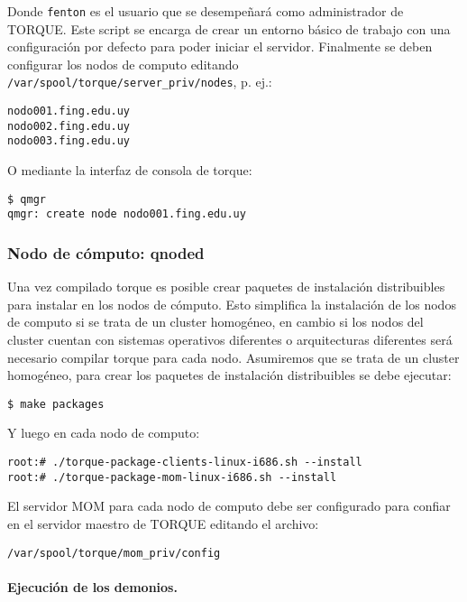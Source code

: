 \documentclass[a4paper,10pt,spanish]{article}
\begin{document}
Donde \mbox{\texttt{fenton}} es el usuario que se desempe\~{n}ar\'{a} como administrador de TORQUE. Este script se encarga de crear un entorno b\'{a}sico de trabajo con una configuraci\'{o}n por defecto para poder iniciar el servidor. Finalmente se deben configurar los nodos de computo editando \mbox{\texttt{/var/spool/torque/server\_priv/nodes}}, p. ej.:

\begin{verbatim}
nodo001.fing.edu.uy
nodo002.fing.edu.uy
nodo003.fing.edu.uy
\end{verbatim}

O mediante la interfaz de consola de torque:

\begin{verbatim}
$ qmgr
qmgr: create node nodo001.fing.edu.uy
\end{verbatim}

\subsubsection{Nodo de c\'{o}mputo: qnoded}

Una vez compilado torque es posible crear paquetes de instalaci\'{o}n distribuibles para instalar en los nodos de c\'{o}mputo. Esto simplifica la instalaci\'{o}n de los nodos de computo si se trata de un cluster homog\'{e}neo, en cambio si los nodos del cluster cuentan con sistemas operativos diferentes o arquitecturas diferentes ser\'{a} necesario compilar torque para cada nodo. Asumiremos que se trata de un cluster homog\'{e}neo, para crear los paquetes de instalaci\'{o}n distribuibles se debe ejecutar:

\begin{verbatim}
$ make packages
\end{verbatim}

Y luego en cada nodo de computo:

\begin{verbatim}
root:# ./torque-package-clients-linux-i686.sh --install
root:# ./torque-package-mom-linux-i686.sh --install
\end{verbatim}

El servidor MOM para cada nodo de computo debe ser configurado para confiar en el servidor maestro de TORQUE editando el archivo:

\begin{verbatim}
/var/spool/torque/mom_priv/config
\end{verbatim}

\paragraph{Ejecuci\'{o}n de los demonios.}
\end{document}
